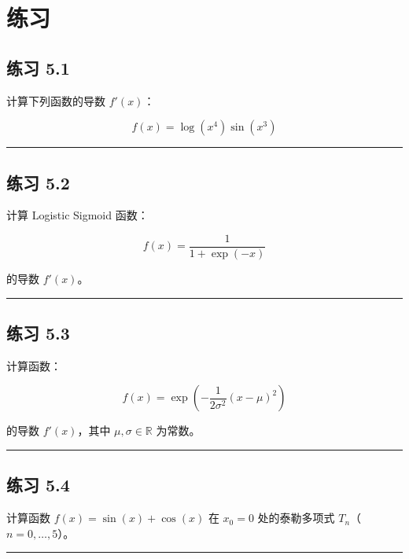 \chapter*{练习}

\section*{练习 5.1}

计算下列函数的导数 $ f'(x) $：

\begin{equation*}
f(x) = \log(x^4) \sin(x^3)
\end{equation*}

\medskip\hrule\medskip

\section*{练习 5.2}

计算 Logistic Sigmoid 函数：

\begin{equation*}
f(x) = \frac{1}{1 + \exp(-x)}
\end{equation*}

的导数 $ f'(x) $。

\medskip\hrule\medskip

\section*{练习 5.3}

计算函数：

\begin{equation*}
f(x) = \exp\left(-\frac{1}{2\sigma^2} (x - \mu)^2\right)
\end{equation*}

的导数 $ f'(x) $，其中 $ \mu, \sigma \in \mathbb{R} $ 为常数。

\medskip\hrule\medskip

\section*{练习 5.4}

计算函数 $ f(x) = \sin(x) + \cos(x) $ 在 $ x_0 = 0 $ 处的泰勒多项式 $ T_n $（$ n = 0, \ldots, 5 $）。

\medskip\hrule\medskip

